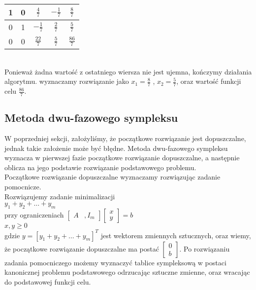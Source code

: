 \documentclass{classrep}
\begin{document}
\begin{tabular}{|c|c|c|c|c|}
\hline 
1 & 0 & $\frac{4}{7}$ & $-\frac{1}{7}$ & $\frac{8}{7}$ \\ 
\hline 
0 & 1 & $-\frac{1}{7}$ & $\frac{2}{7}$ & $\frac{5}{7}$ \\ 
\hline 
0 & 0 & $\frac{22}{7}$ & $\frac{5}{7}$ & $\frac{86}{7}$\\ 
\hline 
\end{tabular} 
\\
Ponieważ żadna wartość z ostatniego wiersza nie jest ujemna, kończymy działania algorytmu. wyznaczamy rozwiązanie jako $x_1 = \frac{8}{7}$ , $x_2=\frac{5}{7}$, oraz wartość funkcji celu $\frac{86}{7}$.

\subsection{Metoda dwu-fazowego sympleksu}

W poprzedniej sekcji, założyliśmy, że początkowe rozwiązanie jest dopuszczalne, jednak takie założenie może być błędne. Metoda dwu-fazowego sympleksu wyznacza w pierwszej fazie początkowe rozwiązanie dopuszczalne, a następnie oblicza na jego podstawie rozwiązanie podstawowego problemu.\\
Początkowe rozwiązanie dopuszczalne wyznaczamy rozwiązując zadanie pomocnicze.\\
Rozwiązujemy zadanie minimalizacji\\
 $y_1+y_2+\dots+y_m$\\
 przy ograniczeniach
 $\left[ \begin{smallmatrix} A &, I_m \end{smallmatrix} \right] \left[ \begin{smallmatrix} x\\y \end{smallmatrix} \right] = b$\\
$x, y \geq 0 $\\
gdzie $y=[y_1+y_2+\dots+y_m]^{T}$ jest wektorem zmiennych sztucznych, oraz wiemy, że początkowe rozwiązanie dopuszczalne ma postać $\left[ \begin{smallmatrix} 0\\b \end{smallmatrix} \right]$.
Po rozwiązaniu zadania pomocniczego możemy wyznaczyć tablice sympleksową w postaci kanonicznej problemu  podstawowego odrzucając sztuczne zmienne, oraz wracając do podstawowej funkcji celu.
\end{document}
